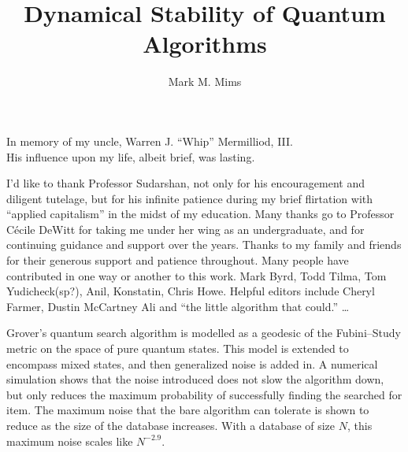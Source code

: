 \documentclass[12pt]{report} %
\author{Mark M. Mims}  %
\title{Dynamical Stability of Quantum Algorithms}
\theoremstyle{definition}
\theoremstyle{remark}
\begin{document}
\copyrightpage                  %

\titlepage                      %

\signaturepage                  %


\begin{dedication}              %
%
In memory of my uncle, Warren J. ``Whip'' Mermilliod, III.  \\
His influence upon my life, albeit brief, was lasting.
\end{dedication}


\begin{acknowledgments}

I'd like to thank Professor Sudarshan, not only 
for his encouragement and diligent tutelage, but for his 
infinite patience during my brief flirtation with 
``applied capitalism'' in the midst of my education.
%
Many thanks go to Professor C\'ecile DeWitt for taking
me under her wing as an undergraduate, and for 
continuing guidance and support over the years.
%
Thanks to my family and friends for
their generous support and patience throughout.
%
Many people have contributed in one way or another
to this work.  
Mark Byrd,
Todd Tilma,
Tom Yudicheck(sp?),
Anil,
Konstatin,
Chris Howe.
Helpful editors include
Cheryl Farmer,
Dustin McCartney
Ali and ``the little algorithm that could.''
\dots
\end{acknowledgments}

\utabstract       %

Grover's quantum search algorithm is modelled as a geodesic
of the Fubini--Study metric on the %
space of pure quantum states.  This model is extended to
encompass mixed states, and then generalized noise is added in.
A numerical simulation shows that 
the noise introduced does not slow the algorithm down, but only
reduces the maximum probability of successfully finding the 
searched for item.  The maximum noise that the bare algorithm
can tolerate is shown to reduce as the size of the database
increases.  With a database of size $N$, this maximum noise 
scales like $N^{-2.9}$.
\end{document}

